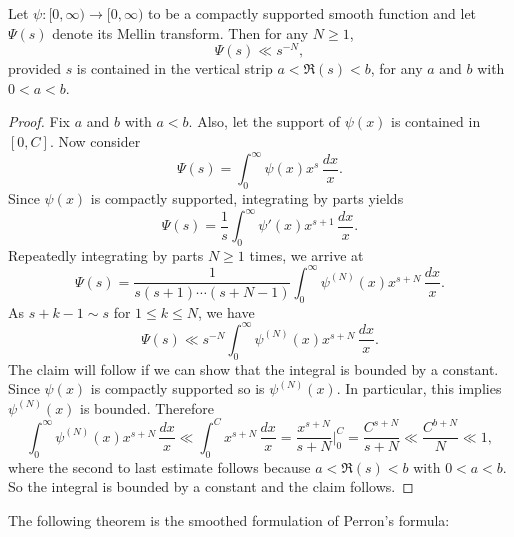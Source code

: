       \begin{proposition}\label{prop:smoothing_function_Mellin_inverse_vertical_strips}
        Let $\psi:[0,\infty) \to [0,\infty)$ to be a compactly supported smooth function and let $\Psi(s)$ denote its Mellin transform. Then for any $N \ge 1$,
        \[
          \Psi(s) \ll s^{-N},
        \]
        provided $s$ is contained in the vertical strip $a < \Re(s) < b$, for any $a$ and $b$ with $0 < a < b$.
      \end{proposition}
      \begin{proof}
        Fix $a$ and $b$ with $a < b$. Also, let the support of $\psi(x)$ is contained in $[0,C]$. Now consider
        \[
          \Psi(s) = \int_{0}^{\infty}\psi(x)x^{s}\,\frac{dx}{x}.
        \]
        Since $\psi(x)$ is compactly supported, integrating by parts yields
        \[
          \Psi(s) = \frac{1}{s}\int_{0}^{\infty}\psi'(x)x^{s+1}\,\frac{dx}{x}.
        \]
        Repeatedly integrating by parts $N \ge 1$ times, we arrive at
        \[
          \Psi(s) = \frac{1}{s(s+1) \cdots (s+N-1)}\int_{0}^{\infty}\psi^{(N)}(x)x^{s+N}\,\frac{dx}{x}.
        \]
        As $s+k-1 \sim s$ for $1 \le k \le N$, we have
        \[
          \Psi(s) \ll s^{-N}\int_{0}^{\infty}\psi^{(N)}(x)x^{s+N}\,\frac{dx}{x}.
        \]
        The claim will follow if we can show that the integral is bounded by a constant. Since $\psi(x)$ is compactly supported so is $\psi^{(N)}(x)$. In particular, this implies $\psi^{(N)}(x)$ is bounded. Therefore
        \[
          \int_{0}^{\infty}\psi^{(N)}(x)x^{s+N}\,\frac{dx}{x} \ll \int_{0}^{C}x^{s+N}\,\frac{dx}{x} = \frac{x^{s+N}}{s+N}\bigg|_{0}^{C} = \frac{C^{s+N}}{s+N} \ll \frac{C^{b+N}}{N} \ll 1,
        \]
        where the second to last estimate follows because $a < \Re(s) < b$ with $0 < a < b$. So the integral is bounded by a constant and the claim follows.
      \end{proof}
      
      The following theorem is the smoothed formulation of Perron's formula:

